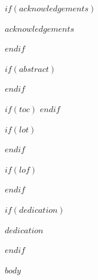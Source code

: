 \documentclass[12pt,a4paper]{reedthesis}
\begin{document}
\addamargin %

\frontmatter %
\pagestyle{empty} %

$if(acknowledgements)$
  \begin{acknowledgements}
    $acknowledgements$
  \end{acknowledgements}
$endif$

$if(abstract)$
  \begin{abstract}
    $abstract$
  \end{abstract}
$endif$


$if(toc)$
  \hypersetup{linkcolor=$if(toccolor)$$toccolor$$else$black$endif$}
  \setcounter{secnumdepth}{$toc-depth$}
  \setcounter{tocdepth}{$toc-depth$}
  \tableofcontents
$endif$

$if(lot)$
  \listoftables
$endif$

$if(lof)$
  \listoffigures
$endif$

$if(dedication)$
  \begin{dedication}
    $dedication$
  \end{dedication}
$endif$

\mainmatter %
\pagestyle{fancyplain} %

$body$


\newpage
\thispagestyle{empty}
\selectfont

\lhead{}
\rhead{}
\rfoot{}
\cfoot{}
\lfoot{}

\noindent
\end{document}
